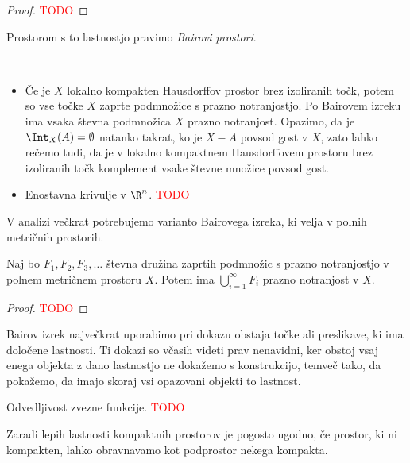 \begin{proof}
    \textcolor{red}{TODO}
\end{proof}

\begin{definicija}
    Prostorom s to lastnostjo pravimo \emph{Bairovi prostori}.
\end{definicija}

\newpage
\begin{primer}
    \
    \begin{itemize}
        \item Če je $X$ lokalno kompakten Hausdorffov prostor brez izoliranih točk, potem so vse točke $X$ zaprte podmnožice s prazno notranjostjo. Po Bairovem izreku ima vsaka števna podmnožica $X$ prazno notranjost. Opazimo, da je $\Int_X(A) = \emptyset$ natanko takrat, ko je $X - A$ povsod gost v $X$, zato lahko rečemo tudi, da je v lokalno kompaktnem Hausdorffovem prostoru brez izoliranih točk komplement vsake števne množice povsod gost.
        \item Enostavna krivulje v \(\R^n\). \textcolor{red}{TODO}
    \end{itemize}
\end{primer}

V analizi večkrat potrebujemo varianto Bairovega izreka, ki velja v polnih metričnih prostorih.

\begin{izrek}
    Naj bo $F_1, F_2, F_3, \ldots$ števna družina zaprtih podmnožic s prazno notranjostjo v polnem metričnem prostoru $X$. Potem ima $\bigcup_{i=1}^\infty F_i$ prazno notranjost v $X$. 
\end{izrek}

\begin{proof}
    \textcolor{red}{TODO}
\end{proof}

Bairov izrek največkrat uporabimo pri dokazu obstaja točke ali preslikave, ki ima določene lastnosti. Ti dokazi so včasih videti prav nenavidni, ker obstoj vsaj enega objekta z dano lastnostjo ne dokažemo s konstrukcijo, temveč tako, da pokažemo, da imajo skoraj vsi opazovani objekti to lastnost.

\begin{primer}
    Odvedljivost zvezne funkcije. \textcolor{red}{TODO}
\end{primer}

Zaradi lepih lastnosti kompaktnih prostorov je pogosto ugodno, če prostor, ki ni kompakten, lahko obravnavamo kot podprostor nekega kompakta.

